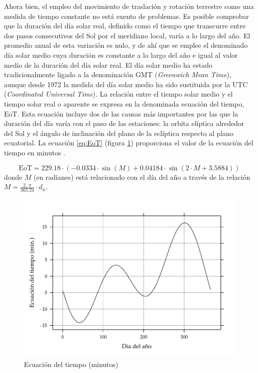 Ahora bien, el empleo del movimiento de traslación y rotación terrestre
como una medida de tiempo constante no está exento de problemas. Es
posible comprobar que la duración del día solar real, definido como
el tiempo que transcurre entre dos pasos consecutivos del Sol por
el meridiano local, varía a lo largo del año. El promedio anual de
esta variación es nulo, y de ahí que se emplee el denominado día solar
medio cuya duración es constante a lo largo del año e igual al valor
medio de la duración del día solar real. El día solar medio ha estado
tradicionalmente ligado a la denominación GMT (\emph{Greenwich Mean
Time}), aunque desde 1972 la medida del día solar medio ha sido sustituida
por la UTC (\emph{Coordinated Universal Time}). La relación entre
el tiempo solar medio y el tiempo solar real o aparente se expresa
en la denominada ecuación del tiempo, $\mathrm{EoT}$.
Esta ecuación incluye dos de las causas más importantes por las que
la duración del día varía con el paso de las estaciones: la orbita
elíptica alrededor del Sol y el ángulo de inclinación del plano de
la eclíptica respecto al plano ecuatorial. La ecuación \ref{eq:EoT}
(figura \ref{fig:EoT}) proporciona el valor de la ecuación del tiempo
en minutos \citep{Whitman2003}.

\begin{equation}
\mathrm{EoT}=229.18\cdot\left(-0.0334\cdot\sin(M)+0.04184\cdot\sin\left(2\cdot
    M+3.5884\right)\right)\label{eq:EoT}\end{equation}
donde $M$ (en radianes) está relacionado con el día del año a través de la relación
$M=\frac{2\cdot\pi}{365.24}\cdot d_{n}$.

%
\begin{figure}


\begin{centering}
\includegraphics[scale=0.65]{../figs/EoT}
\end{centering}

\caption{Ecuación del tiempo (minutos)\label{fig:EoT}}



\end{figure}



